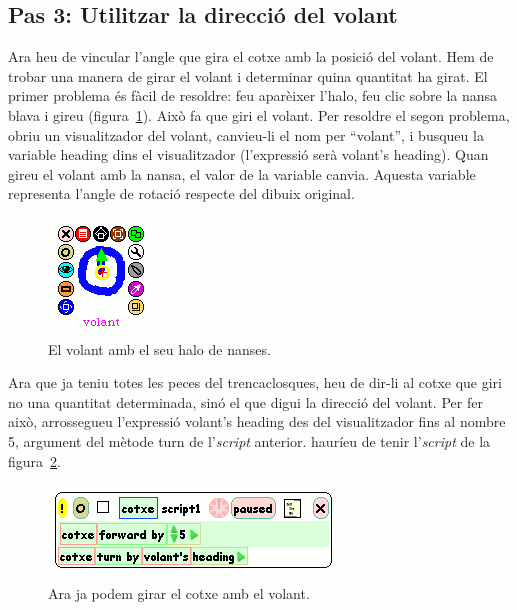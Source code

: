 \subsection{Pas 3: Utilitzar la direcció del volant}
Ara heu de vincular l'angle que gira el cotxe amb la posició del volant. Hem de trobar una manera de girar el volant i determinar quina quantitat ha girat. El primer problema és fàcil de resoldre: feu aparèixer l'halo, feu clic sobre la nansa blava i gireu (figura~\ref{fig2435}). Això fa que giri el volant. Per resoldre el segon problema, obriu un visualitzador del volant, canvieu-li el nom per ``volant'', i busqueu la variable \textsf{heading} dins el visualitzador (l'expressió serà \textsf{volant's heading}). Quan gireu el volant amb la nansa, el valor de la variable canvia. Aquesta variable representa l'angle de rotació respecte del dibuix original. 
\begin{figure}[h!]
\begin{center}
\includegraphics[scale=0.8]{Imatges/figura24-35}
\end{center}
\caption{El volant amb el seu halo de nanses.}
\label{fig2435}
\end{figure}

Ara que ja teniu totes les peces del trencaclosques, heu de dir-li al cotxe que giri no una quantitat determinada, sinó el que digui la direcció del volant.
Per fer això, arrossegueu l'expressió \textsf{volant's heading} des del visualitzador fins al nombre \textsf{5}, argument del mètode \textsf{turn} de l'\emph{script} anterior. hauríeu de tenir l'\emph{script} de la figura~\ref{fig2436}.
\begin{figure}[h!]
\begin{center}
\includegraphics[scale=0.6]{Imatges/figura24-36}
\end{center}
\caption{Ara ja podem girar el cotxe amb el volant.}
\label{fig2436}
\end{figure}

